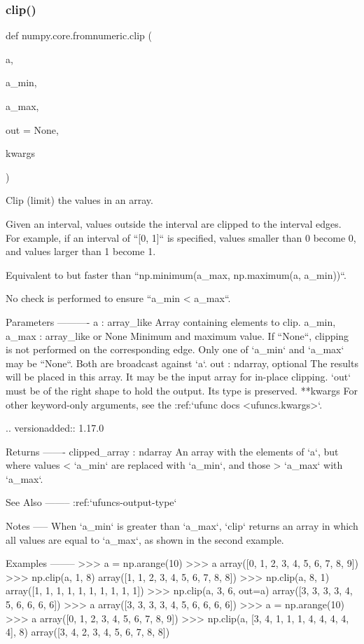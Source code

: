 \subsubsection{\texorpdfstring{clip()}{clip()}}
{\footnotesize\ttfamily def numpy.\+core.\+fromnumeric.\+clip (\begin{DoxyParamCaption}\item[{}]{a,  }\item[{}]{a\+\_\+min,  }\item[{}]{a\+\_\+max,  }\item[{}]{out = {\ttfamily None},  }\item[{}]{kwargs }\end{DoxyParamCaption})}

\begin{DoxyVerb}Clip (limit) the values in an array.

Given an interval, values outside the interval are clipped to
the interval edges.  For example, if an interval of ``[0, 1]``
is specified, values smaller than 0 become 0, and values larger
than 1 become 1.

Equivalent to but faster than ``np.minimum(a_max, np.maximum(a, a_min))``.

No check is performed to ensure ``a_min < a_max``.

Parameters
----------
a : array_like
    Array containing elements to clip.
a_min, a_max : array_like or None
    Minimum and maximum value. If ``None``, clipping is not performed on
    the corresponding edge. Only one of `a_min` and `a_max` may be
    ``None``. Both are broadcast against `a`.
out : ndarray, optional
    The results will be placed in this array. It may be the input
    array for in-place clipping.  `out` must be of the right shape
    to hold the output.  Its type is preserved.
**kwargs
    For other keyword-only arguments, see the
    :ref:`ufunc docs <ufuncs.kwargs>`.

    .. versionadded:: 1.17.0

Returns
-------
clipped_array : ndarray
    An array with the elements of `a`, but where values
    < `a_min` are replaced with `a_min`, and those > `a_max`
    with `a_max`.

See Also
--------
:ref:`ufuncs-output-type`

Notes
-----
When `a_min` is greater than `a_max`, `clip` returns an 
array in which all values are equal to `a_max`, 
as shown in the second example.  

Examples
--------
>>> a = np.arange(10)
>>> a
array([0, 1, 2, 3, 4, 5, 6, 7, 8, 9])
>>> np.clip(a, 1, 8)
array([1, 1, 2, 3, 4, 5, 6, 7, 8, 8])
>>> np.clip(a, 8, 1)
array([1, 1, 1, 1, 1, 1, 1, 1, 1, 1])
>>> np.clip(a, 3, 6, out=a)
array([3, 3, 3, 3, 4, 5, 6, 6, 6, 6])
>>> a
array([3, 3, 3, 3, 4, 5, 6, 6, 6, 6])
>>> a = np.arange(10)
>>> a
array([0, 1, 2, 3, 4, 5, 6, 7, 8, 9])
>>> np.clip(a, [3, 4, 1, 1, 1, 4, 4, 4, 4, 4], 8)
array([3, 4, 2, 3, 4, 5, 6, 7, 8, 8])\end{DoxyVerb}
